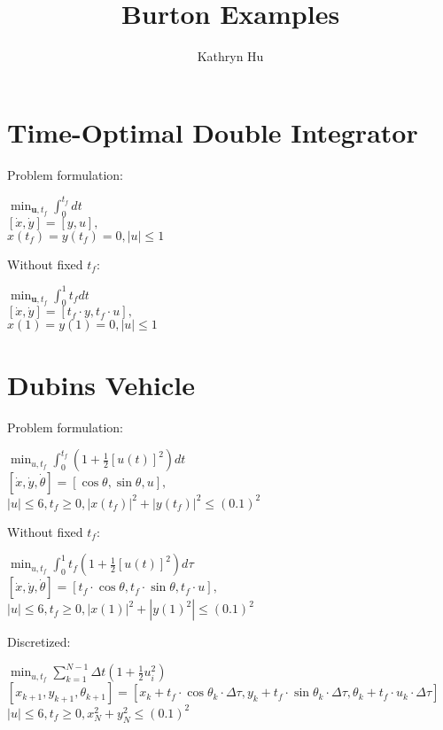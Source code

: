 \documentclass{article}
\title{Burton Examples}
\author{Kathryn Hu}
\begin{document}
\maketitle

\section{Time-Optimal Double Integrator}
Problem formulation:
\begin{center}
    $\displaystyle \min_{\textbf{u},t_f}\int_{0}^{t_f}dt$\\
    $[\dot x, \dot y] = [y, u],$\\
    $x(t_f) = y(t_f) = 0, |u|\leq 1$
\end{center}
Without fixed $t_f$:
\begin{center}
    $\displaystyle \min_{\textbf{u},t_f}\int_{0}^{1}t_fdt$\\
    $[\dot x, \dot y] = [t_f\cdot y, t_f\cdot u],$\\
    $x(1) = y(1) = 0, |u|\leq 1$
\end{center}

\section{Dubins Vehicle}
Problem formulation:
\begin{center}
    $\min_{u,t_f}\int_{0}^{t_f}(1 + \frac{1}{2}[u(t)]^2)dt$\\
    $[\dot x, \dot y, \dot\theta] = [\cos\theta, \sin\theta, u],$\\
    $|u|\leq 6, t_f\geq 0, |x(t_f)|^2 + |y(t_f)|^2\leq (0.1)^2$
\end{center}
Without fixed $t_f$:
\begin{center}
    $\min_{u,t_f}\int_{0}^{1}t_f(1 + \frac{1}{2}[u(t)]^2)d\tau$\\
    $[\dot x, \dot y, \dot\theta] = [t_f\cdot\cos\theta, t_f\cdot\sin\theta, t_f\cdot u],$\\
    $|u|\leq 6, t_f\geq 0, |x(1)|^2 + |y(1)^2|\leq (0.1)^2$
\end{center}
Discretized:
\begin{center}
    $\min_{u,t_f}\sum_{k = 1}^{N - 1}\Delta t(1 + \frac{1}{2}u_i^2)$\\
    $[x_{k + 1}, y_{k + 1}, \theta_{k + 1}] = [x_k + t_f\cdot\cos{\theta_k}\cdot\Delta\tau, y_k + t_f\cdot\sin{\theta_k}\cdot\Delta\tau, \theta_k + t_f\cdot u_k\cdot\Delta\tau]$\\
    $|u|\leq 6, t_f\geq 0, x_N^2 + y_N^2\leq (0.1)^2$
\end{center}
\end{document}
